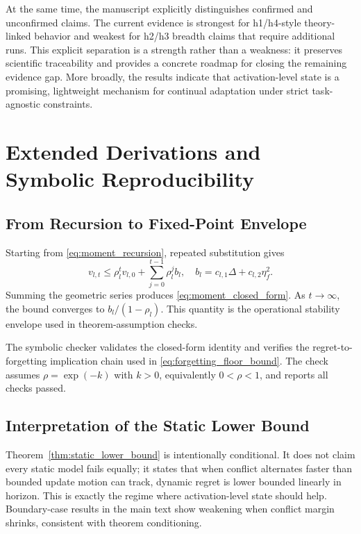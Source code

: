 \documentclass{article} %
\begin{document}
At the same time, the manuscript explicitly distinguishes confirmed and unconfirmed claims. The current evidence is strongest for h1/h4-style theory-linked behavior and weakest for h2/h3 breadth claims that require additional runs. This explicit separation is a strength rather than a weakness: it preserves scientific traceability and provides a concrete roadmap for closing the remaining evidence gap. More broadly, the results indicate that activation-level state is a promising, lightweight mechanism for continual adaptation under strict task-agnostic constraints.







\appendix
\section{Extended Derivations and Symbolic Reproducibility}
\subsection{From Recursion to Fixed-Point Envelope}
Starting from \eqref{eq:moment_recursion}, repeated substitution gives
\[
v_{l,t}\le \rho_l^t v_{l,0}+\sum_{j=0}^{t-1}\rho_l^j b_l,
\quad b_l=c_{l,1}\Delta+c_{l,2}\eta_f^2.
\]
Summing the geometric series produces \eqref{eq:moment_closed_form}. As $t\to\infty$, the bound converges to $b_l/(1-\rho_l)$. This quantity is the operational stability envelope used in theorem-assumption checks.

The symbolic checker validates the closed-form identity and verifies the regret-to-forgetting implication chain used in \eqref{eq:forgetting_floor_bound}. The check assumes $\rho=\exp(-k)$ with $k>0$, equivalently $0<\rho<1$, and reports all checks passed.

\subsection{Interpretation of the Static Lower Bound}
Theorem~\ref{thm:static_lower_bound} is intentionally conditional. It does not claim every static model fails equally; it states that when conflict alternates faster than bounded update motion can track, dynamic regret is lower bounded linearly in horizon. This is exactly the regime where activation-level state should help. Boundary-case results in the main text show weakening when conflict margin shrinks, consistent with theorem conditioning.
\end{document}
